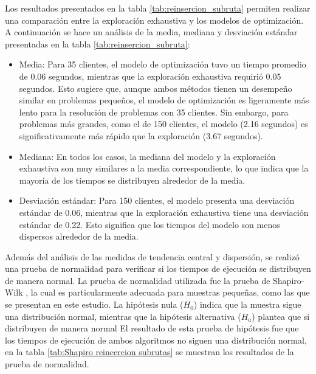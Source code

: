 \documentclass[12pt]{report}
\begin{document}
Los resultados presentados en la tabla \ref{tab:reinsercion_subruta} permiten realizar una comparación entre la exploración exhaustiva y los modelos de optimización. A continuación se hace un análisis de la media, mediana y desviación estándar presentadas en la tabla
\ref{tab:reinsercion_subruta}:
\begin{itemize}
	\item Media: Para 35 clientes, el modelo de optimización tuvo un tiempo promedio de 0.06 segundos, mientras que la exploración exhaustiva requirió 0.05 segundos. Esto sugiere que, aunque ambos métodos tienen un desempeño similar en problemas pequeños, el modelo de optimización es ligeramente más lento para la resolución de problemas con 35 clientes. Sin embargo, para problemas más grandes, como el de 150 clientes, el modelo (2.16 segundos) es significativamente más rápido que la exploración (3.67 segundos).
	\item Mediana: En todos los casos, la mediana del modelo y la exploración exhaustiva son muy similares a la media correspondiente, lo que indica que la mayoría de los tiempos se distribuyen alrededor de la media.
	\item Desviación estándar: Para 150 clientes, el modelo presenta una desviación estándar de 0.06, mientras que la exploración exhaustiva tiene una desviación estándar de 0.22. Esto significa que los tiempos del modelo son menos dispersos alrededor de la media.
\end{itemize}

Además del análisis de las medidas de tendencia central y dispersión, se realizó una prueba de normalidad para verificar si los tiempos de ejecución se distribuyen de manera normal. La prueba de normalidad utilizada fue la prueba de Shapiro-Wilk \cite{ref29}, la cual es particularmente adecuada para muestras pequeñas, como las que se presentan en este estudio. La hipótesis nula ($H_0$) indica que la muestra sigue una distribución normal, mientras que la hipótesis alternativa ($H_a$) plantea que si distribuyen de manera normal El resultado de esta prueba de hipótesis fue que los tiempos de ejecución de ambos algoritmos no siguen una distribución normal, en la tabla \ref{tab:Shapiro reincercion subrutas} se muestran los resultados de la prueba de normalidad.
\end{document}
